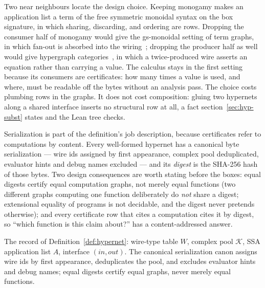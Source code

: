 Two near neighbours locate the design choice. Keeping monogamy makes
an application list a term of the free symmetric monoidal syntax on
the box signature, in which sharing, discarding, and ordering are
rows. Dropping the consumer half of monogamy would give the
gs-monoidal setting of term graphs, in which fan-out is absorbed
into the wiring~\cite{fritzliang22}; dropping the producer half as
well would give hypergraph categories~\cite{bonchi20}, in which a
twice-produced wire asserts an equation rather than carrying a
value. The calculus stays in the first setting because its consumers
are certificates: how many times a value is used, and where, must be
readable off the bytes without an analysis pass. The choice costs
plumbing rows in the graphs. It does not cost composition: gluing
two hypernets along a shared interface inserts no structural row at
all, a fact section~\ref{sec:hyp-subst} states and the Lean tree
checks.

Serialization is part of the definition's job description, because
certificates refer to computations by content. Every well-formed
hypernet has a canonical byte serialization --- wire ids assigned by
first appearance, complex pool deduplicated, evaluator hints and
debug names excluded --- and its \emph{digest} is the SHA-256 hash of
those bytes. Two design consequences are worth stating before the
boxes: equal digests certify equal computation graphs, not merely
equal functions (two different graphs computing one function
deliberately do \emph{not} share a digest; extensional equality of
programs is not decidable, and the digest never pretends otherwise);
and every certificate row that cites a computation cites it by
digest, so ``which function is this claim about?'' has a
content-addressed answer.

\primmeta
{}
\noindent The record of Definition~\ref{def:hypernet}: wire-type table
$W$, complex pool $\mathcal{K}$, SSA application list $A$, interface
$(\mathit{in}, \mathit{out})$. The canonical serialization
$\mathrm{canon}$ assigns wire ids by first appearance, deduplicates the
pool, and excludes evaluator hints and debug names; equal digests
certify equal graphs, never merely equal functions.


